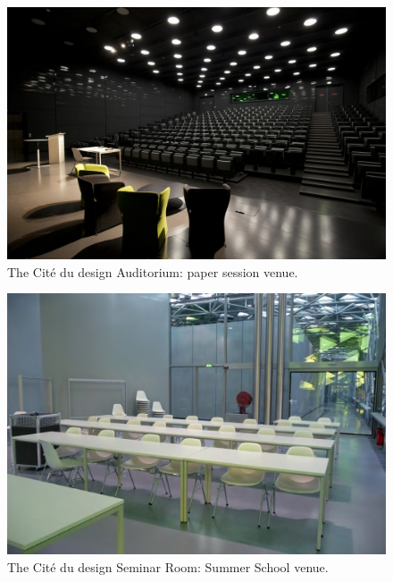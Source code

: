 \documentclass[fontsize=12pt]{scrartcl} %
\numberwithin{equation}{section} %
\numberwithin{figure}{section} %
\numberwithin{table}{section} %
\begin{document}
\begin{figure}[htpb]
\begin{center}
\includegraphics[scale=0.3]{img/amphi.jpg}
\caption{The Cité du design Auditorium: paper session venue.}
\label{fig:amphi}
\end{center}
\end{figure}

\begin{figure}[htpb]
\begin{center}
\includegraphics[scale=0.5]{img/summerSchool.jpg}
\caption{The Cité du design Seminar Room: Summer School venue.}
\label{fig:summerSchool}
\end{center}
\end{figure}
\end{document}
